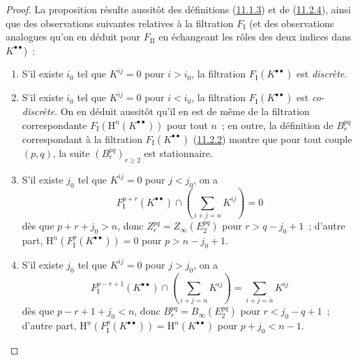 \begin{proof}
La proposition résulte aussitôt des définitions
(\hyperref[0.11.1.3-fr]{11.1.3}) et de
(\hyperref[0.11.2.4-fr]{11.2.4}), ainsi que des observations suivantes
relatives à la filtration $F_{\mathrm I}$ (et des observations analogues qu'on
en déduit pour $F_{\mathrm{II}}$ en échangeant les rôles des deux indices
dans $K^{\bullet\bullet}$)~:
\begin{enumerate}
  \item[$1^\circ$] S'il existe $i_0$ tel que $K^{ij}=0$ pour $i>i_0$, la
    filtration $F_{\mathrm I}(K^{\bullet\bullet})$ est \emph{discrète}.
  \item[$2^\circ$] S'il existe $i_0$ tel que $K^{ij}=0$ pour $i<i_0$, la
    filtration $F_{\mathrm I}(K^{\bullet\bullet})$ est \emph{co-discrète}. On en
    déduit aussitôt qu'il en est de même de la filtration correspondante
    $F_{\mathrm I}(\mathrm H^n(K^{\bullet\bullet}))$ pour tout $n$~; en
    outre, la définition de $B_r^{pq}$ correspondant à la filtration
    $F_{\mathrm I}(K^{\bullet\bullet})$
    (\hyperref[0.11.2.2-fr]{11.2.2}) montre que pour tout couple $(p,q)$, la
    suite $(B_r^{pq})_{r\geq2}$ est stationnaire.
  \item[$3^\circ$] S'il existe $j_0$ tel que $K^{ij}=0$ pour $j<j_0$, on a
    \[
      F_{\mathrm I}^{p+r}(K^{\bullet\bullet})
      \cap\left(\sum_{i+j=n}K^{ij}\right)=0
    \]
    dès que $p+r+j_0>n$, donc
    $Z_r^{pq}=Z_\infty(E_2^{pq})$ pour $r>q-j_0+1$~; d'autre part,
    $\mathrm H^n(F_{\mathrm I}^p(K^{\bullet\bullet}))=0$ pour
    $p>n-j_0+1$.
  \item[$4^\circ$] S'il existe $j_0$ tel que $K^{ij}=0$ pour $j>j_0$, on a
    \[
      F_{\mathrm I}^{p-r+1}(K^{\bullet\bullet})
      \cap\left(\sum_{i+j=n}K^{ij}\right)=\sum_{i+j=n}K^{ij}
    \]
    dès que $p-r+1+j_0<n$, donc
    $B_r^{pq}=B_\infty(E_2^{pq})$ pour $r<j_0-q+1$~; d'autre part,
    $\mathrm H^n(F_{\mathrm I}^p(K^{\bullet\bullet}))
    =\mathrm H^n(K^{\bullet\bullet})$ pour $p+j_0<n-1$.
\end{enumerate}
\end{proof}

